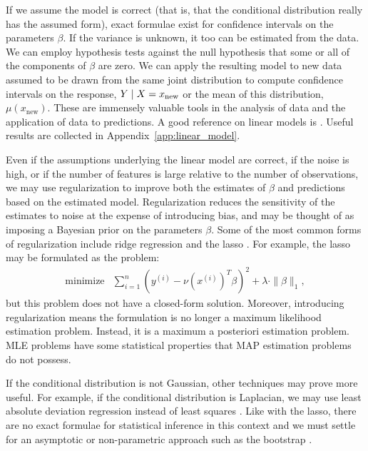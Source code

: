 \documentclass[12pt]{article}
\begin{document}
If we assume the model is correct (that is, that the conditional distribution really has the assumed form), exact formulae exist for confidence intervals on the parameters $\beta$. If the variance is unknown, it too can be estimated from the data. We can employ hypothesis tests against the null hypothesis that some or all of the components of $\beta$ are zero. We can apply the resulting model to new data assumed to be drawn from the same joint distribution to compute confidence intervals on the response, $Y \; | \; X = x_\textrm{new}$ or the mean of this distribution, $\mu(x_\textrm{new})$. These are immensely valuable tools in the analysis of data and the application of data to predictions. A good reference on linear models is \cite{Weisberg:2005}. Useful results are collected in Appendix~\ref{app:linear_model}.

Even if the assumptions underlying the linear model are correct, if the noise is high, or if the number of features is large relative to the number of observations, we may use regularization to improve both the estimates of $\beta$ and predictions based on the estimated model. Regularization reduces the sensitivity of the estimates to noise at the expense of introducing bias, and may be thought of as imposing a Bayesian prior on the parameters $\beta$. Some of the most common forms of regularization include ridge regression and the lasso \cite{Tibs:96}. For example, the lasso may be formulated as the problem:
\begin{displaymath}
        \begin{array}{ll}
            \mbox{minimize} & {\displaystyle \sum_{i=1}^n} \left( y^{(i)} - \nu \left(x^{(i)} \right)^T \beta \right)^2 + \lambda \cdot \| \beta \|_1,
        \end{array}
\end{displaymath}
but this problem does not have a closed-form solution. Moreover, introducing regularization means the formulation is no longer a maximum likelihood estimation problem. Instead, it is a maximum a posteriori estimation problem. MLE problems have some statistical properties that MAP estimation problems do not possess.

If the conditional distribution is not Gaussian, other techniques may prove more useful. For example, if the conditional distribution is Laplacian, we may use least absolute deviation regression instead of least squares \cite{Birkes:1993}. Like with the lasso, there are no exact formulae for statistical inference in this context and we must settle for an asymptotic or non-parametric approach such as the bootstrap \cite{Efron:1993}.
\end{document}
